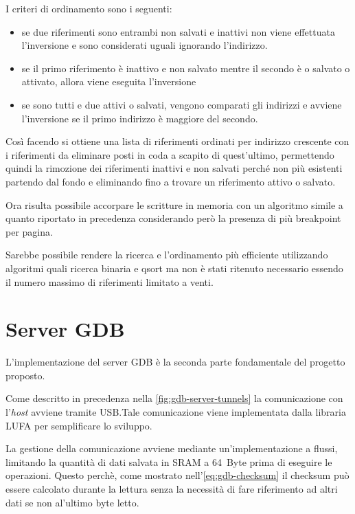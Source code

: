 I criteri di ordinamento sono i seguenti:
\begin{itemize}
    \item se due riferimenti sono entrambi non salvati e inattivi non viene effettuata l'inversione e sono considerati uguali ignorando l'indirizzo.
    \item se il primo riferimento è inattivo e non salvato mentre il secondo è o salvato o attivato, allora viene eseguita l'inversione
    \item se sono tutti e due attivi o salvati, vengono comparati gli indirizzi e avviene l'inversione se il primo indirizzo è maggiore del secondo.
\end{itemize}

Così facendo si ottiene una lista di riferimenti ordinati per indirizzo crescente con i riferimenti da eliminare posti in coda a scapito di quest'ultimo, permettendo quindi la rimozione dei riferimenti inattivi e non salvati perché non più esistenti partendo dal fondo e eliminando fino a trovare un riferimento attivo o salvato.

Ora risulta possibile accorpare le scritture in memoria con un algoritmo simile a quanto riportato in precedenza considerando però la presenza di più breakpoint per pagina.

Sarebbe possibile rendere la ricerca e l'ordinamento più efficiente utilizzando algoritmi quali ricerca binaria e qsort ma non è stati ritenuto necessario essendo il numero massimo di riferimenti limitato a venti.

\section{Server GDB}

L'implementazione del server GDB è la seconda parte fondamentale del progetto proposto.

Come descritto in precedenza nella \cref{fig:gdb-server-tunnels} la comunicazione con l'\textit{host} avviene tramite USB.\@ Tale comunicazione viene implementata dalla libraria LUFA\cite{git:lufa} per semplificare lo sviluppo.

La gestione della comunicazione avviene mediante un'implementazione a flussi, limitando la quantità di dati salvata in SRAM a \SI{64}{Byte} prima di eseguire le operazioni. Questo perchè, come mostrato nell'\cref{eq:gdb-checksum} il checksum può essere calcolato durante la lettura senza la necessità di fare riferimento ad altri dati se non al'ultimo byte letto.

